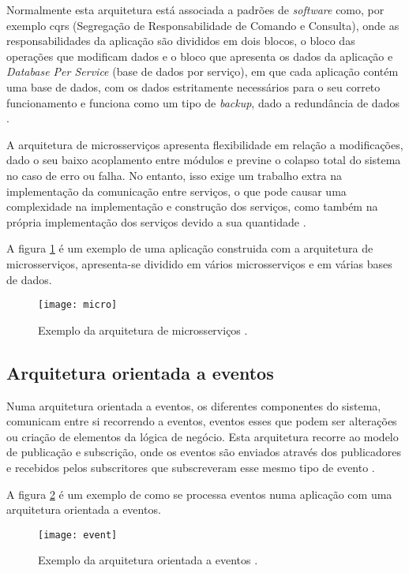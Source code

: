 Normalmente esta arquitetura está associada a padrões de \textit{software} como, por exemplo \ac{cqrs} (Segregação de Responsabilidade de Comando e Consulta), onde as responsabilidades da aplicação são divididos em dois blocos, o bloco das operações que modificam dados e o bloco que apresenta os dados da aplicação \cite{cqrs} e \textit{Database Per Service} (base de dados por serviço), em que cada aplicação contém uma base de dados, com os dados estritamente necessários para o seu correto funcionamento e funciona como um tipo de \textit{backup}, dado a redundância de dados \cite{database}.

A arquitetura de microsserviços apresenta flexibilidade em relação a modificações, dado o seu baixo acoplamento entre módulos e previne o colapso total do sistema no caso de erro ou falha. No entanto, isso exige um trabalho extra na implementação da comunicação entre serviços, o que pode causar uma complexidade na implementação e construção dos serviços, como também na própria implementação dos serviços devido a sua quantidade \cite{monoliticoVandDes}.

A figura \ref{fig:exemplo2} é um exemplo de uma aplicação construida com a arquitetura de microsserviços, apresenta-se dividido em vários microsserviços e em várias bases de dados.

\begin{figure}[H]
	\centering
	\texttt{[image: micro]}
	\caption{Exemplo da arquitetura de microsserviços \cite{imagensMonoMicro}.}
	\label{fig:exemplo2}
\end{figure}

\subsection{Arquitetura orientada a eventos}

Numa arquitetura orientada a eventos, os diferentes componentes do sistema, comunicam entre si recorrendo a eventos, eventos esses que podem ser alterações ou criação de elementos da lógica de negócio. Esta arquitetura recorre ao modelo de publicação e subscrição, onde os eventos são enviados através dos publicadores e recebidos pelos subscritores que subscreveram esse mesmo tipo de evento \cite{eventos}.

A figura \ref{fig:exemplo3} é um exemplo de como se processa eventos numa aplicação com uma arquitetura orientada a eventos.

\begin{figure}[H]
	\centering
	\texttt{[image: event]}
	\caption{Exemplo da arquitetura orientada a eventos \cite{event}.}
	\label{fig:exemplo3}
\end{figure}

